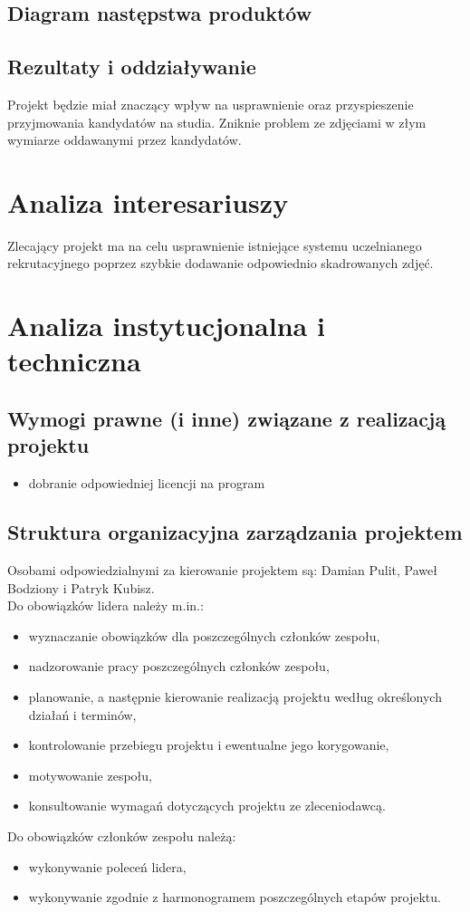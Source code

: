 \subsection{Diagram następstwa produktów}
\subsection{Rezultaty i oddziaływanie}
Projekt będzie miał znaczący wpływ na usprawnienie oraz przyspieszenie przyjmowania kandydatów na studia. Zniknie problem ze zdjęciami w złym wymiarze oddawanymi przez kandydatów.


\section{Analiza interesariuszy}
Zlecający projekt ma na celu usprawnienie istniejące systemu uczelnianego rekrutacyjnego poprzez szybkie dodawanie odpowiednio skadrowanych zdjęć.


\section{Analiza instytucjonalna i techniczna}
\subsection{Wymogi prawne (i inne) związane z realizacją projektu}
\begin{itemize}
\item dobranie odpowiedniej licencji na program
\end{itemize}
\subsection{Struktura organizacyjna zarządzania projektem}
Osobami odpowiedzialnymi za kierowanie projektem są: Damian Pulit, Paweł Bodziony i Patryk Kubisz. \\
Do obowiązków lidera należy m.in.:
\begin{itemize}
\item wyznaczanie obowiązków dla poszczególnych członków zespołu,
\item nadzorowanie pracy poszczególnych członków zespołu,
\item planowanie, a następnie kierowanie realizacją projektu według określonych działań i terminów, 
\item kontrolowanie przebiegu projektu i ewentualne jego korygowanie,
\item motywowanie zespołu,
\item konsultowanie wymagań dotyczących projektu ze zleceniodawcą.
\end{itemize}
Do obowiązków członków zespołu należą:
\begin{itemize}
\item wykonywanie poleceń lidera,
\item wykonywanie zgodnie z harmonogramem poszczególnych etapów projektu.
\end{itemize}
